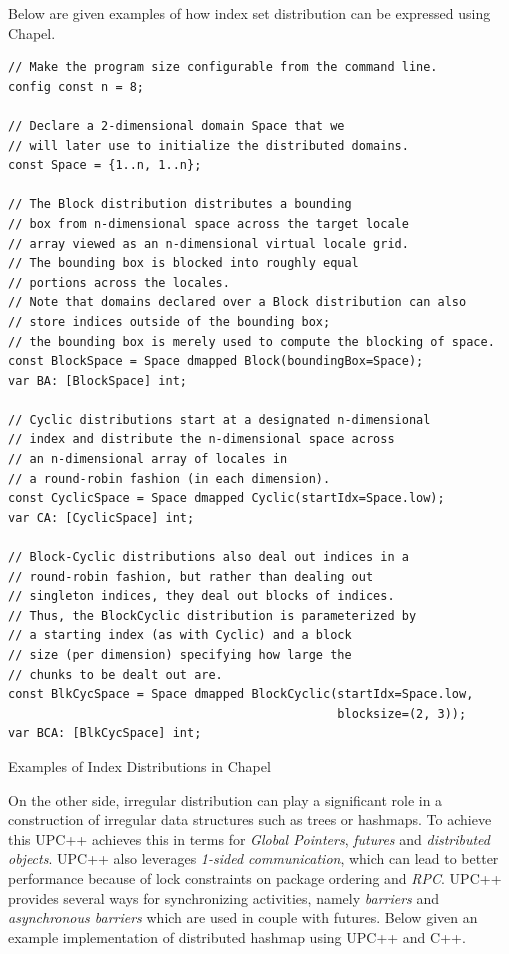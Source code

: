 \documentclass[14pt]{extreport}
\begin{document}
Below are given examples of how index set distribution can be expressed using Chapel.

\begin{listing}[H]
\begin{verbatim}
// Make the program size configurable from the command line.
config const n = 8;

// Declare a 2-dimensional domain Space that we 
// will later use to initialize the distributed domains.
const Space = {1..n, 1..n};

// The Block distribution distributes a bounding 
// box from n-dimensional space across the target locale 
// array viewed as an n-dimensional virtual locale grid. 
// The bounding box is blocked into roughly equal 
// portions across the locales. 
// Note that domains declared over a Block distribution can also 
// store indices outside of the bounding box;
// the bounding box is merely used to compute the blocking of space.
const BlockSpace = Space dmapped Block(boundingBox=Space);
var BA: [BlockSpace] int;

// Cyclic distributions start at a designated n-dimensional 
// index and distribute the n-dimensional space across 
// an n-dimensional array of locales in 
// a round-robin fashion (in each dimension).
const CyclicSpace = Space dmapped Cyclic(startIdx=Space.low);
var CA: [CyclicSpace] int;

// Block-Cyclic distributions also deal out indices in a 
// round-robin fashion, but rather than dealing out 
// singleton indices, they deal out blocks of indices. 
// Thus, the BlockCyclic distribution is parameterized by 
// a starting index (as with Cyclic) and a block 
// size (per dimension) specifying how large the 
// chunks to be dealt out are.
const BlkCycSpace = Space dmapped BlockCyclic(startIdx=Space.low,
                                              blocksize=(2, 3));
var BCA: [BlkCycSpace] int;
\end{verbatim}
\caption{Examples of Index Distributions in Chapel}
\end{listing}

On the other side, irregular distribution can play a significant role in a construction of irregular data structures such as trees or hashmaps. To achieve this UPC++\cite{upcpp} achieves this in terms for \textit{Global Pointers}, \textit{futures} and \textit{distributed objects}. UPC++ also leverages \textit{1-sided communication}, which can lead to better performance because of lock constraints on package ordering and \textit{RPC}. UPC++ provides several ways for synchronizing activities, namely \textit{barriers} and \textit{asynchronous barriers} which are used in couple with futures. Below given an example implementation of distributed hashmap using UPC++ and C++.
\end{document}
